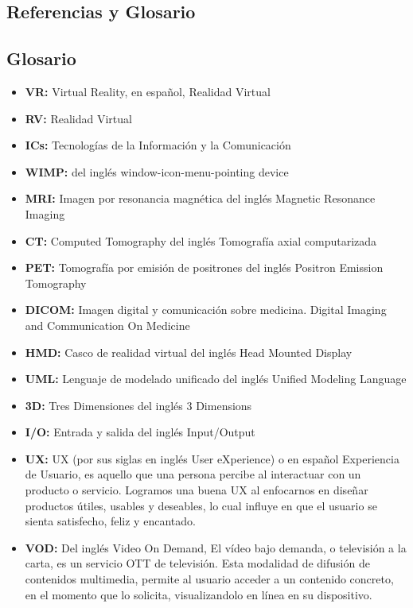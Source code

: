 \begin{center}
    \chapter{Referencias y Glosario}
\end{center}

    \newpage

\section{Glosario}
\begin{itemize}
 \item \textbf{VR:} Virtual Reality, en español, Realidad Virtual
 \item \textbf{RV:} Realidad Virtual
 \item \textbf{ICs:} Tecnologías de la Información y la Comunicación
 \item \textbf{WIMP:} del inglés window-icon-menu-pointing device
 \item \textbf{MRI:} Imagen por resonancia magnética del inglés Magnetic Resonance Imaging
 \item \textbf{CT:} Computed Tomography del inglés Tomografía axial computarizada
 \item \textbf{PET:} Tomografía por emisión de positrones del inglés Positron Emission Tomography
 \item \textbf{DICOM:} Imagen digital y comunicación sobre medicina. Digital Imaging and Communication On Medicine
 \item \textbf{HMD:} Casco de realidad virtual del inglés Head Mounted Display
 \item \textbf{UML:} Lenguaje de modelado unificado del inglés Unified Modeling Language
 \item \textbf{3D:} Tres Dimensiones del inglés 3 Dimensions
 \item \textbf{I/O:} Entrada y salida del inglés Input/Output
 \item \textbf{UX:} UX (por sus siglas en inglés User eXperience) o en español Experiencia de Usuario, es aquello que una persona percibe al interactuar con un producto o servicio. Logramos una buena UX al enfocarnos en diseñar productos útiles, usables y deseables, lo cual influye en que el usuario se sienta satisfecho, feliz y encantado.
 \item \textbf{VOD:} Del inglés  Video On Demand, El vídeo bajo demanda, o televisión a la carta, es un servicio OTT de televisión. Esta modalidad de difusión de contenidos multimedia, permite al usuario acceder a un contenido concreto, en el momento que lo solicita, visualizandolo en línea en su dispositivo.

\end{itemize}
